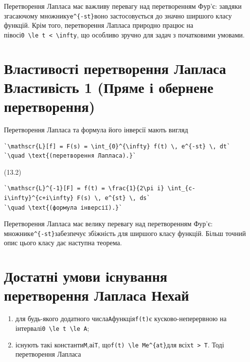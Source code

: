 \documentclass[
  ukrainian,
]{article}
\providecommand{\tightlist}{%
  \setlength{\itemsep}{0pt}\setlength{\parskip}{0pt}}
\begin{document}
Перетворення Лапласа має важливу перевагу над перетворенням Фур'є:
завдяки згасаючому множнику\texttt{e\^{}\{-st\}}воно застосовується до
значно ширшого класу функцій. Крім того, перетворення Лапласа природно
працює на
півосі\texttt{0\ \textbackslash{}le\ t\ \textless{}\ \textbackslash{}infty},
що особливо зручно для задач з початковими умовами.

\section{Властивості перетворення Лапласа Властивість 1 (Пряме і
обернене
перетворення)}\label{ux432ux43bux430ux441ux442ux438ux432ux43eux441ux442ux456-ux43fux435ux440ux435ux442ux432ux43eux440ux435ux43dux43dux44f-ux43bux430ux43fux43bux430ux441ux430-ux432ux43bux430ux441ux442ux438ux432ux456ux441ux442ux44c-1-ux43fux440ux44fux43cux435-ux456-ux43eux431ux435ux440ux43dux435ux43dux435-ux43fux435ux440ux435ux442ux432ux43eux440ux435ux43dux43dux44f}

Перетворення Лапласа та формула його інверсії мають вигляд

\begin{verbatim}
`\mathscr{L}[f] = F(s) = \int_{0}^{\infty} f(t) \, e^{-st} \, dt`
`\quad \text{(перетворення Лапласа).}`
\end{verbatim}

(13.2)

\begin{verbatim}
`\mathscr{L}^{-1}[F] = f(t) = \frac{1}{2\pi i} \int_{c-i\infty}^{c+i\infty} F(s) \, e^{st} \, ds`
`\quad \text{(формула інверсії).}`
\end{verbatim}

Перетворення Лапласа має велику перевагу над перетворенням Фур'є:
множник\texttt{e\^{}\{-st\}}забезпечує збіжність для ширшого класу
функцій. Більш точний опис цього класу дає наступна теорема.

\section{Достатні умови існування перетворення Лапласа
Нехай}\label{ux434ux43eux441ux442ux430ux442ux43dux456-ux443ux43cux43eux432ux438-ux456ux441ux43dux443ux432ux430ux43dux43dux44f-ux43fux435ux440ux435ux442ux432ux43eux440ux435ux43dux43dux44f-ux43bux430ux43fux43bux430ux441ux430-ux43dux435ux445ux430ux439}

\begin{enumerate}
\def\labelenumi{\arabic{enumi}.}
\tightlist
\item
  для будь-якого додатного числа\texttt{A}функція\texttt{f(t)}є
  кусково-неперервною на
  інтервалі\texttt{0\ \textbackslash{}le\ t\ \textbackslash{}le\ A};
\item
  існують такі константи\texttt{M},\texttt{a}і\texttt{T},
  що\texttt{\textbar{}f(t)\textbar{}\ \textbackslash{}le\ Me\^{}\{at\}}для
  всіх\texttt{t\ \textgreater{}\ T}. Тоді перетворення Лапласа
\end{enumerate}
\end{document}
